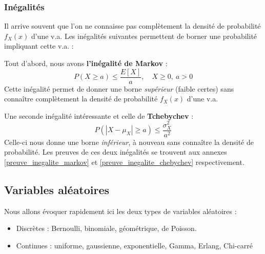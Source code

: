 \documentclass[11pt,a4paper]{article}
\numberwithin{equation}{section}
\begin{document}
\subsubsection{Inégalités}
Il arrive souvent que l'on ne connaisse pas complètement la densité de probabilité $f_X(x)$ d'une v.a. Les inégalités suivantes permettent de borner une probabilité impliquant cette v.a. :

Tout d'abord, nous avons \textbf{l'inégalité de Markov} :
\begin{equation}
	P(X \geq a) \leq \frac{E[X]}{a},\quad X\geq 0,\ a > 0
\end{equation}
Cette inégalité permet de donner une borne \textit{supérieur} (faible certes) sans connaître complètement la densité de probabilité $f_X(x)$ d'une v.a.

Une seconde inégalité intéressante et celle de \textbf{Tchebychev} :
\begin{equation}
	P(|X-\mu_X| \geq a) \leq \frac{\sigma_X^2}{a^2}
\end{equation}
Celle-ci nous donne une borne \textit{inférieur}, à nouveau sans connaître la densité de probabilité. Les preuves de ces deux inégalités se trouvent aux annexes \ref{preuve_inegalite_markov} et \ref{preuve_inegalite_chebychev} respectivement.



\subsection{Variables aléatoires}
Nous allons évoquer rapidement ici les deux types de variables aléatoires :
\begin{itemize}
    \item Discrètes : Bernoulli, binomiale, géométrique, de Poisson.
    \item Continues : uniforme, gaussienne, exponentielle, Gamma, Erlang, Chi-carré
\end{itemize}
\end{document}
